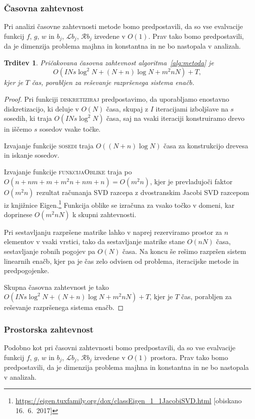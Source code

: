 \documentclass[12pt,a4paper,twoside]{article}
\theoremstyle{definition} %
\theoremstyle{plain} %
\newtheorem{trditev}[definicija]{Trditev}
\numberwithin{equation}{section}
\newcommand{\Rc}{\mathcal{R}}
\renewcommand{\L}{\mathcal{L}}
\begin{document}
\subsubsection{Časovna zahtevnost}
\label{sec:casovna-zahtevnost}
Pri analizi časovne zahtevnosti metode bomo predpostavili, da so
vse evalvacije funkcij $f$, $g$, $w$ in $b_j$, $\L b_j$, $\Rc b_j$ izvedene v $O(1)$.
Prav tako bomo predpostavili, da je dimenzija problema majhna in konstantna in
ne bo nastopala v analizah.

\begin{trditev}
  Pričakovana časovna zahtevnost algoritma~\ref{alg:metoda} je
  \begin{equation}
    O(I N s \log^2 N + (N+n)\log N + m^2n N) + T,
    \label{eq:casovna-zahtevnost}
  \end{equation}
  kjer je $T$ čas, porabljen za reševanje razpršenega sistema enačb.
\end{trditev}
\begin{proof}
Pri funkciji \textsc{diskretiziraj} predpostavimo, da uporabljamo enostavno
diskretizacijo, ki deluje v $O(N)$ časa, skupaj z $I$ iteracijami izboljšave
na $s$ sosedih, ki traja $O(I N s \log^2 N)$ časa, saj na vsaki iteraciji
konstruiramo drevo in iščemo $s$ sosedov vsake točke.

Izvajanje funkcije \textsc{sosedi} traja $O((N+n) \log N)$ časa za konstrukcijo
drevesa in iskanje sosedov.

Izvajanje funkcije \textsc{funkcijaOblike} traja po $O(n + nm + m + m^2n + nm +
n) = O(m^2n)$, kjer je prevladujoči faktor $O(m^2 n)$ rezultat računanja SVD
razcepa z dvostranskim Jacobi SVD razcepom iz knjižnice
Eigen.\footnote{\url{https://eigen.tuxfamily.org/dox/classEigen_1_1JacobiSVD.html}
[obiskano 16.\ 6.\ 2017]} Funkcija oblike se izračuna za vsako točko v domeni,
kar doprinese $O(m^2 n N)$ k skupni zahtevnosti.

Pri sestavljanju razpršene matrike lahko v naprej rezerviramo prostor za $n$
elementov v vsaki vrstici, tako da sestavljanje matrike stane $O(nN)$ časa,
sestavljanje robnih pogojev pa $O(N)$ časa. Na koncu še rešimo razpršen sistem
linearnih enačb, kjer pa je čas zelo odvisen od problema, iteracijske metode in
predpogojenke.

Skupna časovna zahtevnost je tako $O(I N s \log^2 N + (N+n)\log N + m^2n N) + T$,
kjer je $T$ čas, porabljen za reševanje razpršenega sistema enačb.
\end{proof}

\subsubsection{Prostorska zahtevnost}
Podobno kot pri časovni zahtevnosti bomo predpostavili, da so vse evalvacije funkcij $f$, $g$, $w$
in $b_j$, $\L b_j$, $\Rc b_j$ izvedene v $O(1)$ prostora.  Prav tako bomo predpostavili, da je
dimenzija problema majhna in konstantna in ne bo nastopala v analizah.
\end{document}
